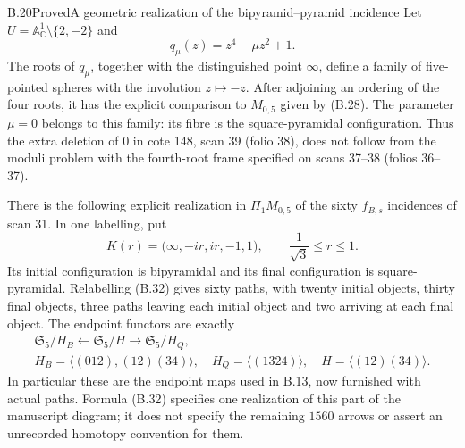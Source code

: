 \begin{result}{B.20}{Proved}{A geometric realization of the bipyramid--pyramid incidence}
Let $U=\mathbb A^1_{\mathbb C}\setminus\{2,-2\}$ and
\[
 q_\mu(z)=z^4-\mu z^2+1.
\]
The roots of $q_\mu$, together with the distinguished point
$\infty$, define a family of five-pointed spheres with the
involution $z\mapsto-z$.  After adjoining an ordering of the
four roots, it has the explicit comparison to $M_{0,5}$ given
by (B.28).  The parameter $\mu=0$ belongs to this family:
its fibre is the square-pyramidal configuration.  Thus the
extra deletion of $0$ in cote 148, scan 39 (folio 38), does not
follow from the moduli problem with the fourth-root frame
specified on scans 37--38 (folios 36--37).

There is the following explicit realization in $\Pi_1M_{0,5}$
of the sixty $f_{B,s}$ incidences of scan 31.  In one labelling,
put
\[
 K(r)=\bigl(\infty,-ir,ir,-1,1\bigr),
 \qquad \frac1{\sqrt3}\leq r\leq1.                 \tag{B.32}
\]
Its initial configuration is bipyramidal and its final
configuration is square-pyramidal.  Relabelling (B.32) gives
sixty paths, with twenty initial objects, thirty final objects,
three paths leaving each initial object and two arriving at
each final object.  The endpoint functors are exactly
\[
 \begin{gathered}
 \mathfrak S_5/H_B \longleftarrow
 \mathfrak S_5/H \longrightarrow \mathfrak S_5/H_Q,\\
 H_B=\langle(012),(12)(34)\rangle,\quad
 H_Q=\langle(1324)\rangle,\quad
 H=\langle(12)(34)\rangle.
 \end{gathered}                                    \tag{B.33}
\]
In particular these are the endpoint maps used in B.13,
now furnished with actual paths.  Formula (B.32) specifies
one realization of this part of the manuscript diagram;
it does not specify the remaining $1560$ arrows or assert
an unrecorded homotopy convention for them.
\end{result}

